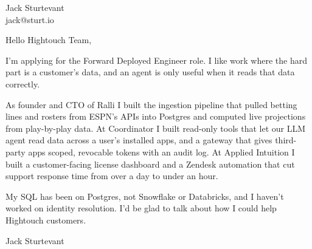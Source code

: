 \documentclass[11pt]{article}
\begin{document}
\raggedright

{\namefont\fontsize{20pt}{24pt}\selectfont Jack Sturtevant}\\[-0.3em]
jack@sturt.io

\vspace{1.2em}

Hello Hightouch Team,

I'm applying for the Forward Deployed Engineer role. I like work where the hard part is a customer's data, and an agent is only useful when it reads that data correctly.

As founder and CTO of Ralli I built the ingestion pipeline that pulled betting lines and rosters from ESPN's APIs into Postgres and computed live projections from play-by-play data. At Coordinator I built read-only tools that let our LLM agent read data across a user's installed apps, and a gateway that gives third-party apps scoped, revocable tokens with an audit log. At Applied Intuition I built a customer-facing license dashboard and a Zendesk automation that cut support response time from over a day to under an hour.

My SQL has been on Postgres, not Snowflake or Databricks, and I haven't worked on identity resolution. I'd be glad to talk about how I could help Hightouch customers.

\vspace{0.6em}
Jack Sturtevant
\end{document}
